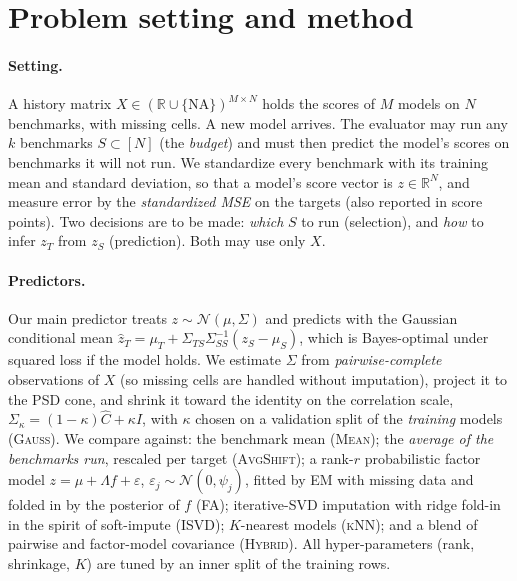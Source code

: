 \section{Problem setting and method}
\label{sec:method}

\paragraph{Setting.}
A history matrix $X\in(\mathbb{R}\cup\{\text{NA}\})^{M\times N}$ holds the scores of $M$ models on $N$ benchmarks, with missing cells.
A new model arrives. The evaluator may run any $k$ benchmarks $S\subset[N]$ (the \emph{budget}) and must then predict the model's scores on benchmarks it will not run.
We standardize every benchmark with its training mean and standard deviation, so that a model's score vector is $z\in\mathbb{R}^N$, and measure error by the \emph{standardized MSE} on the targets (also reported in score points).
Two decisions are to be made: \emph{which} $S$ to run (selection), and \emph{how} to infer $z_{T}$ from $z_S$ (prediction).
Both may use only $X$.

\paragraph{Predictors.}
Our main predictor treats $z\sim\mathcal N(\mu,\Sigma)$ and predicts with the Gaussian conditional mean $\hat z_T=\mu_T+\Sigma_{TS}\Sigma_{SS}^{-1}(z_S-\mu_S)$, which is Bayes-optimal under squared loss if the model holds.
We estimate $\Sigma$ from \emph{pairwise-complete} observations of $X$ (so missing cells are handled without imputation), project it to the PSD cone, and shrink it toward the identity on the correlation scale, $\Sigma_\kappa=(1-\kappa)\hat C+\kappa I$, with $\kappa$ chosen on a validation split of the \emph{training} models (\textsc{Gauss}).
We compare against: the benchmark mean (\textsc{Mean}); the \emph{average of the benchmarks run}, rescaled per target (\textsc{AvgShift}); a rank-$r$ probabilistic factor model $z=\mu+\Lambda f+\varepsilon$, $\varepsilon_j\sim\mathcal N(0,\psi_j)$, fitted by EM with missing data \citep{tipping1999ppca} and folded in by the posterior of $f$ (\textsc{FA}); iterative-SVD imputation with ridge fold-in in the spirit of soft-impute \citep{mazumder2010softimpute} (\textsc{ISVD}); $K$-nearest models (\textsc{kNN}); and a blend of pairwise and factor-model covariance (\textsc{Hybrid}). All hyper-parameters (rank, shrinkage, $K$) are tuned by an inner split of the training rows.

